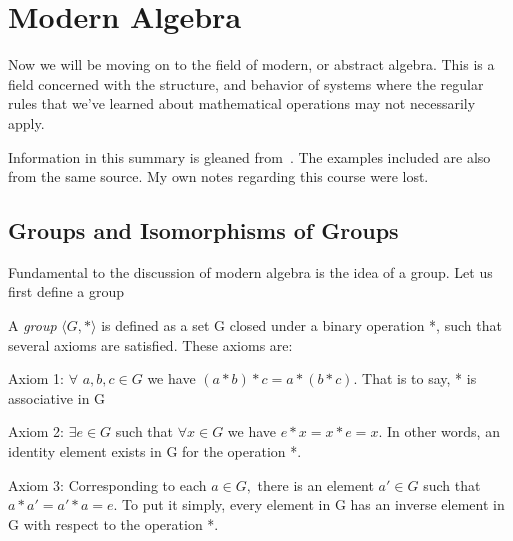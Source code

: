 \section{Modern Algebra}%
Now we will be moving on to the field of modern, or abstract algebra. This is a field concerned with the structure, and behavior of systems where the regular rules that we've learned about mathematical operations may not necessarily apply.\newline

Information in this summary is gleaned from~\cite{ModernAlg}. The examples included are also from the same source. My own notes regarding this course were lost.

\subsection{Groups and Isomorphisms of Groups}
Fundamental to the discussion of modern algebra is the idea of a group. Let us first define a group

\begin{definition}
A \emph{group} $\langle G , * \rangle$ is defined as a set G closed under a binary operation *, such that several axioms are satisfied. These axioms are: \newline

Axiom 1: $ \forall$ $a,b,c \in G $ we have \newline
$(a*b)*c = a*(b*c).$\newline
That is to say, * is associative in G \newline

Axiom 2: $ \exists e \in G$ such that $\forall x \in G$ we have \newline
$e*x = x*e = x.$ \newline
In other words, an identity element exists in G for the operation *. \newline

Axiom 3: Corresponding to each $a \in G,$ there is an element $a' \in G$ such that \newline
$a*a'=a'*a = e.$ \newline
To put it simply, every element in G has an inverse element in G with respect to the operation *.

\end{definition}

